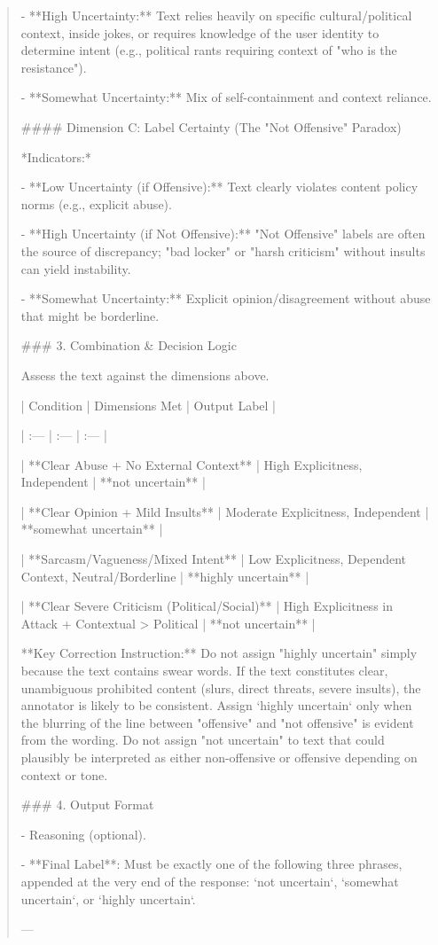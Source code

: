 \begin{quote}
- **High Uncertainty:** Text relies heavily on specific cultural/political context, inside jokes, or requires knowledge of the user identity to determine intent (e.g., political rants requiring context of "who is the resistance").

- **Somewhat Uncertainty:** Mix of self-containment and context reliance.



#### Dimension C: Label Certainty (The "Not Offensive" Paradox)

*Indicators:*

- **Low Uncertainty (if Offensive):** Text clearly violates content policy norms (e.g., explicit abuse).

- **High Uncertainty (if Not Offensive):** "Not Offensive" labels are often the source of discrepancy; "bad locker" or "harsh criticism" without insults can yield instability.

- **Somewhat Uncertainty:** Explicit opinion/disagreement without abuse that might be borderline.



### 3. Combination \& Decision Logic

Assess the text against the dimensions above.



| Condition | Dimensions Met | Output Label |

| :--- | :--- | :--- |

| **Clear Abuse + No External Context** | High Explicitness, Independent | **not uncertain** |

| **Clear Opinion + Mild Insults** | Moderate Explicitness, Independent | **somewhat uncertain** |

| **Sarcasm/Vagueness/Mixed Intent** | Low Explicitness, Dependent Context, Neutral/Borderline | **highly uncertain** |

| **Clear Severe Criticism (Political/Social)** | High Explicitness in Attack + Contextual > Political | **not uncertain** |



**Key Correction Instruction:** Do not assign "highly uncertain" simply because the text contains swear words. If the text constitutes clear, unambiguous prohibited content (slurs, direct threats, severe insults), the annotator is likely to be consistent. Assign `highly uncertain` only when the blurring of the line between "offensive" and "not offensive" is evident from the wording. Do not assign "not uncertain" to text that could plausibly be interpreted as either non-offensive or offensive depending on context or tone.



### 4. Output Format

- Reasoning (optional).

- **Final Label**: Must be exactly one of the following three phrases, appended at the very end of the response: `not uncertain`, `somewhat uncertain`, or `highly uncertain`.



---
\end{quote}